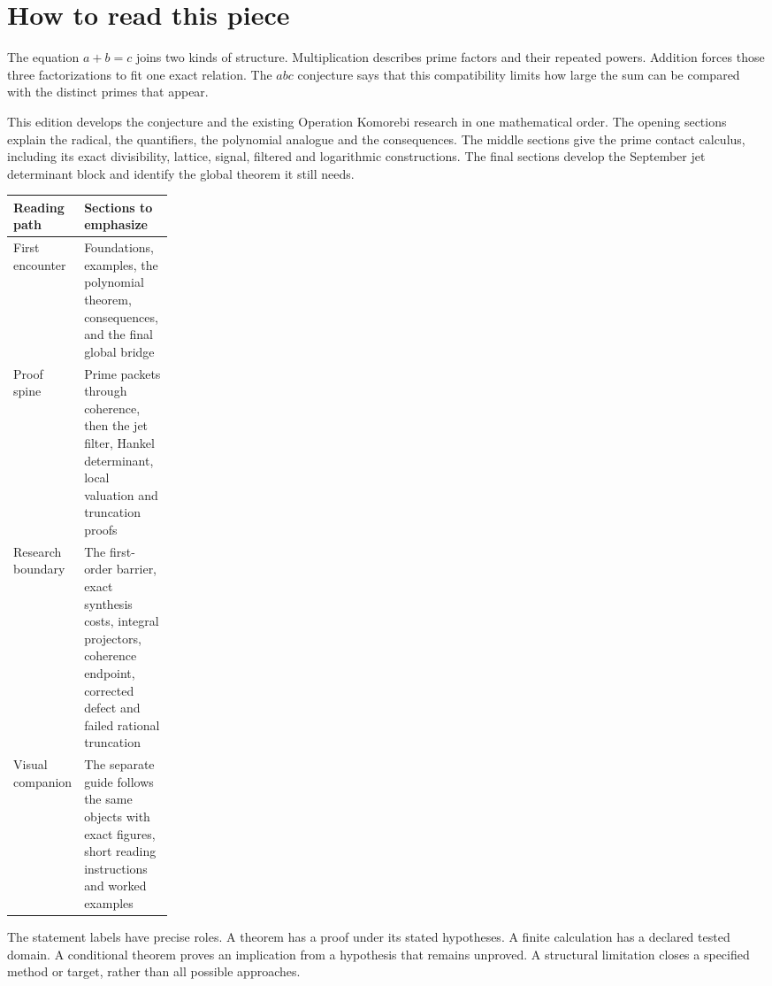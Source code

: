 \section*{How to read this piece}
The equation $a+b=c$ joins two kinds of structure. Multiplication describes prime factors and their repeated powers. Addition forces those three factorizations to fit one exact relation. The $abc$ conjecture says that this compatibility limits how large the sum can be compared with the distinct primes that appear.

This edition develops the conjecture and the existing Operation Komorebi research in one mathematical order. The opening sections explain the radical, the quantifiers, the polynomial analogue and the consequences. The middle sections give the prime contact calculus, including its exact divisibility, lattice, signal, filtered and logarithmic constructions. The final sections develop the September jet determinant block and identify the global theorem it still needs.

\begin{center}
\begin{tabularx}{\linewidth}{@{}p{0.21\linewidth}X@{}}
\toprule
Reading path & Sections to emphasize\\
\midrule
First encounter & Foundations, examples, the polynomial theorem, consequences, and the final global bridge\\
Proof spine & Prime packets through coherence, then the jet filter, Hankel determinant, local valuation and truncation proofs\\
Research boundary & The first-order barrier, exact synthesis costs, integral projectors, coherence endpoint, corrected defect and failed rational truncation\\
Visual companion & The separate guide follows the same objects with exact figures, short reading instructions and worked examples\\
\bottomrule
\end{tabularx}
\end{center}

The statement labels have precise roles. A theorem has a proof under its stated hypotheses. A finite calculation has a declared tested domain. A conditional theorem proves an implication from a hypothesis that remains unproved. A structural limitation closes a specified method or target, rather than all possible approaches.


